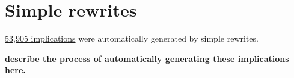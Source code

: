 \chapter{Simple rewrites}\label{simple-rewrite-chapter}

\href{https://github.com/teorth/equational_theories/tree/main/equational_theories/SimpleRewrites/theorems}{53,905 implications} were automatically generated by simple rewrites.

{\bf describe the process of automatically generating these implications here.}
